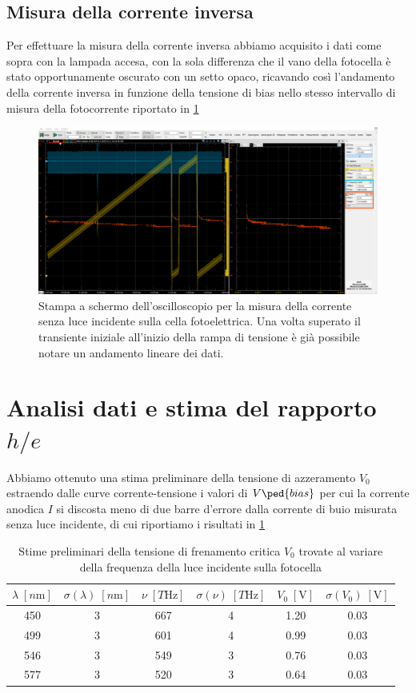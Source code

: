 \documentclass[10pt, a4paper, italian]{article}
\begin{document}
\subsection{Misura della corrente inversa}
Per effettuare la misura della corrente inversa abbiamo acquisito i dati come
sopra con la lampada accesa, con la sola differenza che il vano della
fotocella è stato opportunamente oscurato con un setto opaco, ricavando così
l'andamento della corrente inversa in funzione della tensione di bias nello
stesso intervallo di misura della fotocorrente riportato in \cref{fig: dark}
\begin{figure}[htbp]
    \centering
	\includegraphics[width=\textwidth]{dark}
    \caption{Stampa a schermo dell'oscilloscopio per la misura della corrente
    senza luce incidente sulla cella fotoelettrica. Una volta superato il
    transiente iniziale all'inizio della rampa di tensione è già possibile
    notare un andamento lineare dei dati.
    \label{fig: dark}}
\end{figure}

\section{Analisi dati e stima del rapporto $h/e$}
Abbiamo ottenuto una stima preliminare della tensione di azzeramento $V_0$
estraendo dalle curve corrente-tensione i valori di $V\ped{bias}$ per cui la
corrente anodica $I$ si discosta meno di due barre d'errore dalla corrente di
buio misurata senza luce incidente, di cui riportiamo i risultati in
\cref{tab: V0prel}
\begin{table}
\centering
\begin{tabular}{cccccc}
\toprule
$\lambda \; [\si{n\m}]$ & $\sigma(\lambda) \; [\si{n\m}]$ &
$\nu \; [\si{T \Hz}]$ & $\sigma(\nu) \; [\si{T \Hz}]$ &
$V_0 \; [\si{\V}]$ & $\sigma(V_0) \; [\si{\V}]$ \\
\midrule
450 & 3 & 667 & 4 & 1.20 & 0.03 \\
499 & 3 & 601 & 4 & 0.99 & 0.03 \\
546 & 3 & 549 & 3 & 0.76 & 0.03 \\
577 & 3 & 520 & 3 & 0.64 & 0.03 \\
\bottomrule
\end{tabular}
\caption{Stime preliminari della tensione di frenamento critica $V_0$ trovate
al variare della frequenza della luce incidente sulla fotocella
\label{tab: V0prel}}
\end{table}
\end{document}
